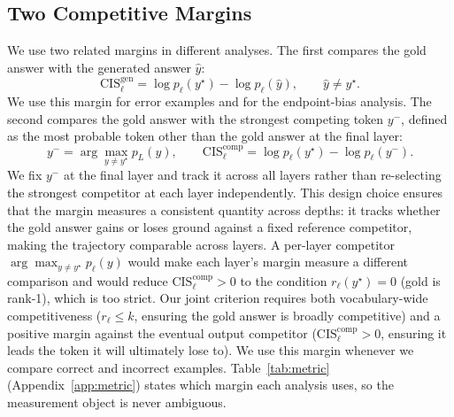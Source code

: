 \documentclass{article} %
\begin{document}
\subsection{Two Competitive Margins}
We use two related margins in different analyses. The first compares the gold answer with the generated answer $\hat{y}$:
\begin{equation}
\mathrm{CIS}^{\mathrm{gen}}_\ell = \log p_\ell(y^\star) - \log p_\ell(\hat{y}), \qquad \hat{y} \neq y^\star .
\end{equation}
We use this margin for error examples and for the endpoint-bias analysis. The second compares the gold answer with the strongest competing token $y^-$, defined as the most probable token other than the gold answer at the final layer:
\begin{equation}
y^- = \arg\max_{y \neq y^\star} p_L(y), \qquad
\mathrm{CIS}^{\mathrm{comp}}_\ell = \log p_\ell(y^\star) - \log p_\ell(y^-) .
\end{equation}
We fix $y^-$ at the final layer and track it across all layers rather than re-selecting the strongest competitor at each layer independently. This design choice ensures that the margin measures a consistent quantity across depths: it tracks whether the gold answer gains or loses ground against a fixed reference competitor, making the trajectory comparable across layers. A per-layer competitor $\arg\max_{y \neq y^\star} p_\ell(y)$ would make each layer's margin measure a different comparison and would reduce $\mathrm{CIS}^{\mathrm{comp}}_\ell > 0$ to the condition $r_\ell(y^\star) = 0$ (gold is rank-1), which is too strict. Our joint criterion requires both vocabulary-wide competitiveness ($r_\ell \le k$, ensuring the gold answer is broadly competitive) and a positive margin against the eventual output competitor ($\mathrm{CIS}^{\mathrm{comp}}_\ell > 0$, ensuring it leads the token it will ultimately lose to). We use this margin whenever we compare correct and incorrect examples. Table~\ref{tab:metric} (Appendix~\ref{app:metric}) states which margin each analysis uses, so the measurement object is never ambiguous.
\end{document}
